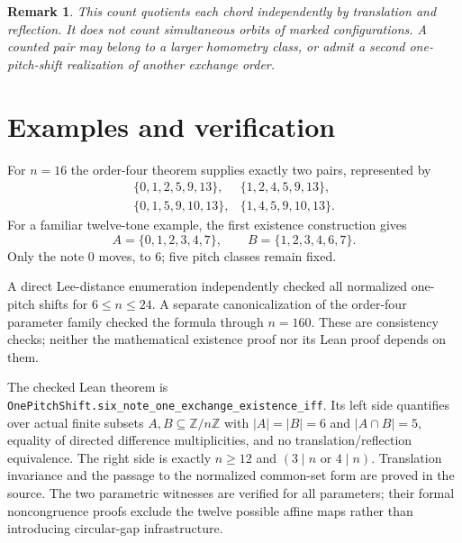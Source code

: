 \documentclass[11pt]{article}
\newtheorem{remark}[theorem]{Remark}
\newcommand{\Z}{\mathbb Z}
\begin{document}
\begin{remark}
This count quotients each chord independently by translation and reflection. It does not count simultaneous orbits of marked configurations. A counted pair may belong to a larger homometry class, or admit a second one-pitch-shift realization of another exchange order.
\end{remark}

\section{Examples and verification}
For $n=16$ the order-four theorem supplies exactly two pairs, represented by
\[
\begin{array}{ll}
\{0,1,2,5,9,13\},&\{1,2,4,5,9,13\},\\
\{0,1,5,9,10,13\},&\{1,4,5,9,10,13\}.
\end{array}
\]
For a familiar twelve-tone example, the first existence construction gives
\[
 A=\{0,1,2,3,4,7\},\qquad B=\{1,2,3,4,6,7\}.
\]
Only the note $0$ moves, to $6$; five pitch classes remain fixed.

\begin{center}
\end{center}

A direct Lee-distance enumeration independently checked all normalized one-pitch shifts for $6\le n\le24$. A separate canonicalization of the order-four parameter family checked the formula through $n=160$. These are consistency checks; neither the mathematical existence proof nor its Lean proof depends on them.

The checked Lean theorem is \texttt{OnePitchShift.six\_note\_one\_exchange\_existence\_iff}. Its left side quantifies over actual finite subsets $A,B\subseteq\Z/n\Z$ with $|A|=|B|=6$ and $|A\cap B|=5$, equality of directed difference multiplicities, and no translation/reflection equivalence. The right side is exactly $n\ge12$ and $(3\mid n\text{ or }4\mid n)$. Translation invariance and the passage to the normalized common-set form are proved in the source. The two parametric witnesses are verified for all parameters; their formal noncongruence proofs exclude the twelve possible affine maps rather than introducing circular-gap infrastructure.
\end{document}
